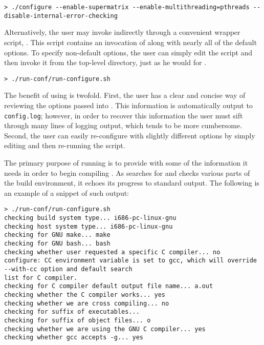 \begin{Verbatim}[frame=single,framesep=2.5mm,xleftmargin=5mm,commandchars=\\\{\},fontsize=\footnotesize]
> ./configure --enable-supermatrix --enable-multithreading=pthreads --disable-internal-error-checking
\end{Verbatim}

\noindent
Alternatively, the user may invoke \configure indirectly through a convenient
wrapper script, \runconfigurens.
This script contains an invocation of \configure along with nearly all of
the default \configure options.
To specify non-default options, the user can simply edit the script and
then invoke it from the top-level directory, just as he would for
\configurens.

\begin{Verbatim}[frame=single,framesep=2.5mm,xleftmargin=5mm,commandchars=\\\{\},fontsize=\footnotesize]
> ./run-conf/run-configure.sh
\end{Verbatim}

\noindent
The benefit of using \runconfigure is twofold.
First, the user has a clear and concise way of reviewing the options passed
into \configurens.
This information is automatically output to {\tt config.log}; however, in
order to recover this information the user must sift through many lines of
logging output, which tends to be more cumbersome.
Second, the user can easily re-configure \libflame with slightly different
options by simply editing \runconfigure and then re-running the script.


The primary purpose of running \configure is to provide \make with some of
the information it needs in order to begin compiling \libflamens.
As \configure searches for and checks various parts of the build environment,
it echoes its progress to standard output.
The following is an example of a snippet of such output:

\begin{Verbatim}[frame=single,framesep=2.5mm,xleftmargin=5mm,commandchars=\\\{\},fontsize=\footnotesize]
> ./run-conf/run-configure.sh 
checking build system type... i686-pc-linux-gnu
checking host system type... i686-pc-linux-gnu
checking for GNU make... make
checking for GNU bash... bash
checking whether user requested a specific C compiler... no
configure: CC environment variable is set to gcc, which will override --with-cc option and default search
list for C compiler.
checking for C compiler default output file name... a.out
checking whether the C compiler works... yes
checking whether we are cross compiling... no
checking for suffix of executables... 
checking for suffix of object files... o
checking whether we are using the GNU C compiler... yes
checking whether gcc accepts -g... yes
\end{Verbatim}

